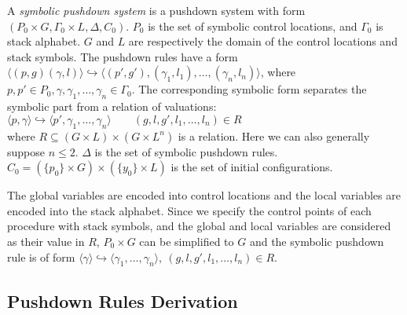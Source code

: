 \documentclass{llncs}
\begin{document}
\begin{definition}
A \emph{symbolic pushdown system} is a pushdown system with form
$(P_0\times G,\Gamma_0\times L,\Delta,C_0)$. $P_0$ is the set of
symbolic control locations, and $\Gamma_0$ is stack alphabet. $G$
and $L$ are respectively the domain of the control locations and
stack symbols. The pushdown rules have a form $\langle
(p,g)(\gamma,l)\rangle \hookrightarrow \langle
(p',g'),(\gamma_1,l_1),\ldots,(\gamma_n,l_n)\rangle $, where
$p,p'\in P_0, \gamma,\gamma_1,\ldots,\gamma_n\in \Gamma_0$. The
corresponding symbolic form separates the symbolic part from a
relation of valuations:\\
\hspace*{\fill}$\langle p,\gamma\rangle \hookrightarrow \langle
p',\gamma_1,\ldots,\gamma_n\rangle\qquad(g,l,g',l_1,\ldots,l_n)\in R$\hspace*{\fill}\\
where $R\subseteq (G\times L)\times (G\times L^n)$ is a relation.
Here we can also generally suppose $n\leqslant 2$. $\Delta$ is the
set of symbolic pushdown rules. $C_0=(\{p_0\}\times G)\times
(\{y_0\}\times L)$ is the set of initial configurations.
\end{definition}

The global variables are encoded into control locations and the
local variables are encoded into the stack alphabet. Since we
specify the control points of each procedure with stack symbols, and
the global and local variables are considered as their value in $R$,
$P_0\times G$ can be simplified to $G$ and the symbolic pushdown
rule is of form $\langle \gamma\rangle \hookrightarrow \langle
\gamma_1,\ldots,\gamma_n\rangle,\ (g,l,g',l_1,\ldots,l_n)\in R$.

\subsection{\label{subsec:derivation}Pushdown Rules Derivation}
\end{document}
